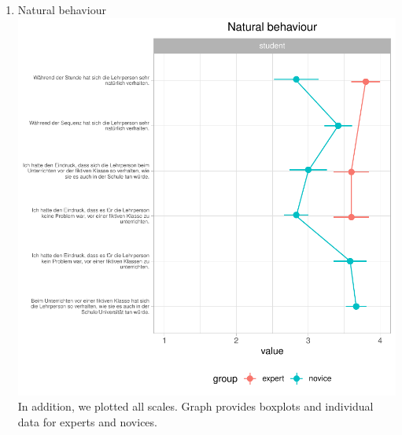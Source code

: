 \documentclass[
  english,
  man,floatsintext]{apa6}
\providecommand{\tightlist}{%
  \setlength{\itemsep}{0pt}\setlength{\parskip}{0pt}}
\begin{document}
\begin{enumerate}
\def\labelenumi{(\arabic{enumi})}
\setcounter{enumi}{7}
\tightlist
\item
  Natural behaviour
  \includegraphics{paper_1_supplement_new_table_files/figure-latex/Natural behaviour line plots-1.pdf}
  \newpage
  In addition, we plotted all scales. Graph provides boxplots and individual data for experts and novices.
\end{enumerate}
\end{document}
